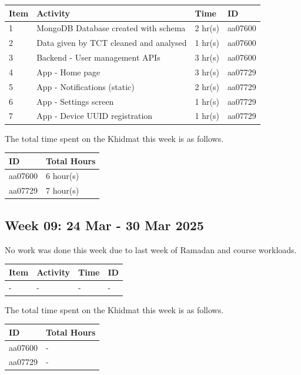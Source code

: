 \documentclass[12pt,a4paper]{article}
\begin{document}
\begin{center}
    \bigskip
    \begin{tabular}{|l|l|l|l|}
        \hline
        Item 	& Activity & Time & ID \\\hline\hline
        1	& MongoDB Database created with schema & 2 hr(s) & aa07600 \\\hline
        2	& Data given by TCT cleaned and analysed & 1 hr(s) & aa07600 \\\hline
        3	& Backend - User management APIs & 3 hr(s) & aa07600 \\\hline\hline
        4	& App - Home page & 3 hr(s) & aa07729 \\\hline
        5	& App - Notifications (static) & 2 hr(s) & aa07729 \\\hline
        6	& App - Settings screen & 1 hr(s) & aa07729 \\\hline
        7	& App - Device UUID registration & 1 hr(s) & aa07729 \\\hline
    \end{tabular}

    \bigskip
    The total time spent on the Khidmat this week is as follows.

    \bigskip
    \begin{tabular}{|l|l|}
        \hline
        ID & Total Hours\\\hline\hline
        aa07600 & 6 hour(s)\\\hline
        aa07729 & 7 hour(s)\\\hline
    \end{tabular}
\end{center}

\newpage

\subsection{Week 09: 24 Mar - 30 Mar 2025}
No work was done this week due to last week of Ramadan and course workloads.

\begin{center}
    \bigskip
    \begin{tabular}{|l|l|l|l|}
        \hline
        Item 	& Activity & Time & ID \\\hline\hline
        - & - & - & - \\\hline
    \end{tabular}

    \bigskip
    The total time spent on the Khidmat this week is as follows.

    \bigskip
    \begin{tabular}{|l|l|}
        \hline
        ID & Total Hours\\\hline\hline
        aa07600 & -\\\hline
        aa07729 & -\\\hline
    \end{tabular}
\end{center}
\end{document}

